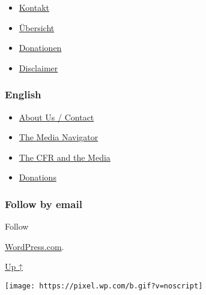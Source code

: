 \begin{itemize}
\tightlist
\item
  \href{https://swprs.org/kontakt/}{Kontakt}
\item
  \href{https://swprs.org/uebersicht/}{Übersicht}
\item
  \href{https://swprs.org/donationen/}{Donationen}
\item
  \href{https://swprs.org/disclaimer/}{Disclaimer}
\end{itemize}

\hypertarget{english}{%
\subsubsection{English}\label{english}}

\begin{itemize}
\tightlist
\item
  \href{https://swprs.org/contact/}{About Us / Contact}
\item
  \href{https://swprs.org/media-navigator/}{The Media Navigator}
\item
  \href{https://swprs.org/the-american-empire-and-its-media/}{The CFR
  and the Media}
\item
  \href{https://swprs.org/donations/}{Donations}
\end{itemize}

\hypertarget{follow-by-email}{%
\subsubsection{Follow by email}\label{follow-by-email}}

Follow

\href{https://wordpress.com/?ref=footer_custom_com}{WordPress.com}.

\protect\hyperlink{}{Up ↑}

\texttt{[image: https://pixel.wp.com/b.gif?v=noscript]}
